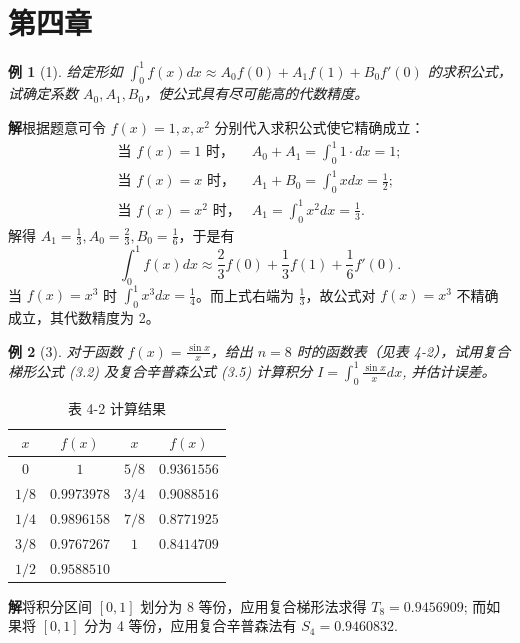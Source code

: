 \documentclass[a4paper,12pt]{ctexart}
\theoremstyle{exampleStyle}
\newtheorem*{example}{例}
\newcommand{\solution}{\par\noindent\textbf{解}\quad}
\begin{document}
\section*{第四章}

\begin{example}[1]
给定形如 $\int_0^1 f(x)dx \approx A_0 f(0) + A_1 f(1) + B_0 f'(0)$ 的求积公式，试确定系数 $A_0, A_1, B_0$，使公式具有尽可能高的代数精度。
\end{example}

\solution 根据题意可令 $f(x) = 1, x, x^2$ 分别代入求积公式使它精确成立：
\begin{align*}
\text{当 } f(x)=1 \text{ 时，} & A_0 + A_1 = \int_0^1 1 \cdot dx = 1; \\
\text{当 } f(x)=x \text{ 时，} & A_1 + B_0 = \int_0^1 x dx = \frac{1}{2}; \\
\text{当 } f(x)=x^2 \text{ 时，} & A_1 = \int_0^1 x^2 dx = \frac{1}{3}.
\end{align*}
解得 $A_1 = \frac{1}{3}, A_0 = \frac{2}{3}, B_0 = \frac{1}{6}$，于是有
\[
\int_0^1 f(x) dx \approx \frac{2}{3} f(0) + \frac{1}{3} f(1) + \frac{1}{6} f'(0).
\]
当 $f(x) = x^3$ 时 $\int_0^1 x^3 dx = \frac{1}{4}$。而上式右端为 $\frac{1}{3}$，故公式对 $f(x)=x^3$ 不精确成立，其代数精度为 2。

\begin{example}[3]
对于函数 $f(x) = \frac{\sin x}{x}$，给出 $n=8$ 时的函数表（见表 4-2），试用复合梯形公式 (3.2) 及复合辛普森公式 (3.5) 计算积分
$I = \int_0^1 \frac{\sin x}{x} dx$, 并估计误差。
\end{example}

\begin{table}[H]
\centering
\caption*{表 4-2 计算结果}
\begin{tabular}{c c | c c}
\toprule
$x$ & $f(x)$ & $x$ & $f(x)$ \\
\midrule
$0$ & $1$ & $5/8$ & $0.9361556$ \\
$1/8$ & $0.9973978$ & $3/4$ & $0.9088516$ \\
$1/4$ & $0.9896158$ & $7/8$ & $0.8771925$ \\
$3/8$ & $0.9767267$ & $1$ & $0.8414709$ \\
$1/2$ & $0.9588510$ & & \\
\bottomrule
\end{tabular}
\end{table}

\solution 将积分区间 $[0, 1]$ 划分为 8 等份，应用复合梯形法求得 $T_8 = 0.9456909$;
而如果将 $[0, 1]$ 分为 4 等份，应用复合辛普森法有 $S_4 = 0.9460832$.
\end{document}
